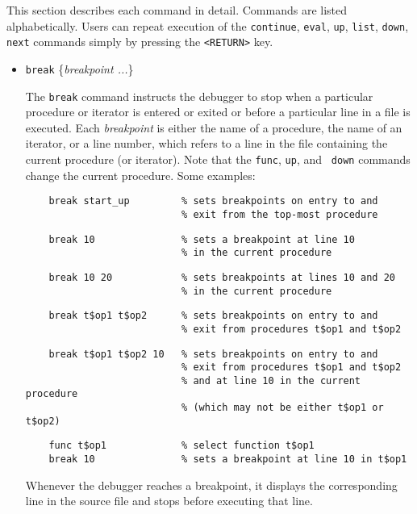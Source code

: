 This section describes each command in detail.  Commands are listed
alphabetically.  Users can repeat execution of the {\tt continue},
{\tt eval}, {\tt up}, {\tt list}, {\tt down}, {\tt next} commands
simply by pressing the {\tt <RETURN>} key.



\begin{itemize}

\item {\tt break} \{{\it breakpoint ...}\}
  
  The {\tt break} command instructs the debugger to stop when a
  particular procedure or iterator is entered or exited or before a
  particular line in a file is executed.  Each {\it breakpoint} is
  either the name of a procedure, the name of an iterator, or a line
  number, which refers to a line in the file containing the current
  procedure (or iterator).  Note that the {\tt func}, {\tt up}, and {\tt
  down} commands change the current procedure.  Some examples:
  \begin{verbatim}
    break start_up         % sets breakpoints on entry to and
                           % exit from the top-most procedure
  \end{verbatim}
  \begin{verbatim}
    break 10               % sets a breakpoint at line 10
                           % in the current procedure
  \end{verbatim}
  \begin{verbatim}
    break 10 20            % sets breakpoints at lines 10 and 20
                           % in the current procedure
  \end{verbatim}
  \begin{verbatim}
    break t$op1 t$op2      % sets breakpoints on entry to and
                           % exit from procedures t$op1 and t$op2
  \end{verbatim}
  \begin{verbatim}
    break t$op1 t$op2 10   % sets breakpoints on entry to and
                           % exit from procedures t$op1 and t$op2       
                           % and at line 10 in the current procedure
                           % (which may not be either t$op1 or t$op2)
  \end{verbatim}
  \begin{verbatim}
    func t$op1             % select function t$op1
    break 10               % sets a breakpoint at line 10 in t$op1
  \end{verbatim}
  Whenever the debugger reaches a breakpoint, it displays the
  corresponding line in the source file and stops before executing
  that line.


\end{itemize}
